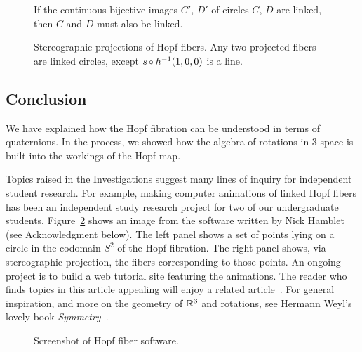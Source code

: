 \documentclass[11pt]{article}
\newcommand{\R}{\Bbb R}
\def\of{\, \mbox{\small{$\circ$}} \:}
\begin{document}
\begin{figure}[h]
\begin{center}

\end{center}
\vspace*{-.2in}\caption{\small If the continuous bijective images $C'$,
$D'$ of circles $C$, $D$ are linked, then $C$ and $D$ must also be
linked.}
\label{pairolinks}
\end{figure}

\begin{figure}[h]
\begin{center}

\end{center}
\vspace*{-.2in}\caption{\small Stereographic projections of Hopf fibers.  Any two
projected fibers are linked circles, except $s\of h^{-1}(1,0,0)$ is a line.}
\end{figure}

\subsection*{Conclusion}

We have explained how the Hopf fibration can be understood in terms of
quaternions.  In the process, we showed how the algebra of
rotations in 3-space is built into the workings of the Hopf map.

Topics raised in the Investigations suggest many lines of inquiry for
independent student research.  For example, making computer animations
of linked Hopf fibers has been an independent study research project for
two of our undergraduate students.  Figure~\ref{sh} shows an image from
the software written by Nick Hamblet (see Acknowledgment below).  The
left panel shows a set of points lying on a circle in the codomain $S^2$
of the Hopf fibration.  The right panel shows, via stereographic
projection, the fibers corresponding to those points.  An ongoing
project is to build a web tutorial site featuring the animations.  The
reader who finds topics in this article appealing will enjoy a related
article~\cite{zulli}.  For general inspiration, and more on the geometry
of $\R^3$ and rotations, see Hermann Weyl's lovely book {\it
Symmetry}~\cite{weyl}.

\begin{figure}[h]
\begin{center}

\end{center}
\vspace*{-.2in}\caption{\small Screenshot of Hopf fiber software.}
\label{sh}
\end{figure}
\end{document}
